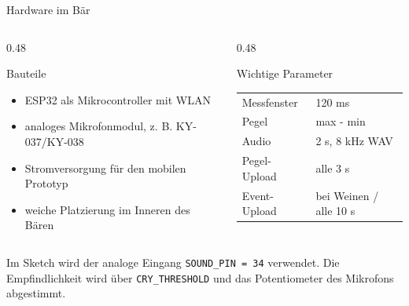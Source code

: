\documentclass[aspectratio=169,11pt]{beamer}
\begin{document}
\begin{frame}{Hardware im Bär}
  \begin{columns}[T,totalwidth=\textwidth]
    \begin{column}{0.48\textwidth}
      \begin{block}{Bauteile}
        \begin{itemize}
          \item ESP32 als Mikrocontroller mit WLAN
          \item analoges Mikrofonmodul, z. B. KY-037/KY-038
          \item Stromversorgung für den mobilen Prototyp
          \item weiche Platzierung im Inneren des Bären
        \end{itemize}
      \end{block}
    \end{column}
    \begin{column}{0.48\textwidth}
      \begin{block}{Wichtige Parameter}
        \begin{tabular}{ll}
          \toprule
          Messfenster & 120 ms\\
          Pegel & max - min\\
          Audio & 2 s, 8 kHz WAV\\
          Pegel-Upload & alle 3 s\\
          Event-Upload & bei Weinen / alle 10 s\\
          \bottomrule
        \end{tabular}
      \end{block}
    \end{column}
  \end{columns}

  \vspace{0.7em}
  \small
  Im Sketch wird der analoge Eingang \texttt{SOUND\_PIN = 34} verwendet.
  Die Empfindlichkeit wird über \texttt{CRY\_THRESHOLD} und das Potentiometer
  des Mikrofons abgestimmt.
\end{frame}
\end{document}

